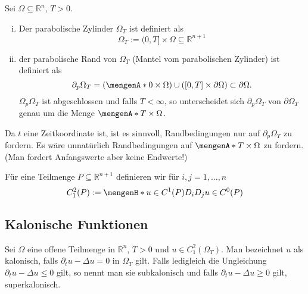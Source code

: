 \begin{definition}
	Sei $\Omega \subseteq \mathbb{R}^n$, $T >0$.
	\begin{enumerate}[(i)]
		\item Der parabolische Zylinder $\Omega_T$ ist definiert als
		\[
			\Omega_T := (0,T] \times \Omega \subseteq \mathbb{R}^{n+1}
		\]
		\item der parabolische Rand von $\Omega_T$ (Mantel vom parabolischen Zylinder) ist definiert als
		\[
			\partial_p \Omega_T = ( \set{0} \times \Omega) \cup ( [0,T] \times \partial \Omega) \subset \partial \Omega .
		\]
		$\Omega_p \Omega_T$ ist abgeschlossen und falls $T < \infty$, 
		so unterscheidet sich $\partial_p \Omega_T$ von $\partial \Omega_T$ genau um die Menge $\set{T} \times \Omega$.
	\end{enumerate}
\end{definition}

\begin{bemerkung}
	Da $t$ eine Zeitkoordinate ist, ist es sinnvoll, Randbedingungen nur auf $\partial_p \Omega_T$ zu fordern. 
	Es wäre unnatürlich Randbedingungen auf $\set{T} \times \Omega$ zu fordern. (Man fordert Anfangswerte aber keine Endwerte!)
\end{bemerkung}
Für eine Teilmenge $P \subseteq \mathbb{R}^{n+1}$ definieren wir für $i,j=1,\dots,n$ 
\[
	C^2_1(P):= \set[u \in C^1(P)]{ D_iD_j u \in C^0(P)}
\]

\subsection{Kalonische Funktionen} 
\label{sub:kalonische_funktionen}

\begin{definition}
	Sei $\Omega$ eine offene Teilmenge in $\mathbb{R}^n$, $T >0$ und $u \in C^2_1(\Omega_T)$. Man bezeichnet $u$ als kalonisch, falls $\partial_t u - \Delta u =0$ in 
	$\Omega_T$ gilt. Falls ledigleich die Ungleichung $\partial_t u - \Delta u \leq 0$ gilt, so nennt man sie subkalonisch und falls $\partial_t u - \Delta u \geq 0$
	gilt, superkalonisch.
\end{definition}


